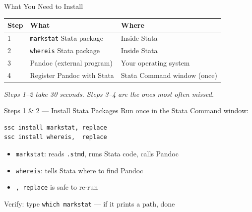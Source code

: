 \documentclass[dvipsnames,hyperref={pdfpagelabels=false}]{beamer}
\begin{document}
\begin{frame}{What You Need to Install}
  \begin{center}
    \begin{tabular}{lll}
      \toprule
      \textbf{Step} & \textbf{What} & \textbf{Where} \\
      \midrule
      1 & \texttt{markstat} Stata package & Inside Stata \\
      2 & \texttt{whereis} Stata package  & Inside Stata \\
      3 & Pandoc (external program)       & Your operating system \\
      4 & Register Pandoc with Stata      & Stata Command window (once) \\
      \bottomrule
    \end{tabular}
  \end{center}

  \vspace{1em}
  \textit{Steps 1--2 take 30 seconds. Steps 3--4 are the ones most often missed.}
\end{frame}

\begin{frame}[fragile]{Steps 1 \& 2 --- Install Stata Packages}
  Run once in the Stata Command window:
  \begin{lstlisting}
ssc install markstat, replace
ssc install whereis,  replace
  \end{lstlisting}

  \begin{itemize}
    \item \texttt{markstat}: reads \texttt{.stmd}, runs Stata code, calls Pandoc
    \item \texttt{whereis}: tells Stata where to find Pandoc
    \item \texttt{, replace} is safe to re-run
  \end{itemize}

  \vspace{0.5em}
  Verify: type \texttt{which markstat} --- if it prints a path, done \checkmark
\end{frame}
\end{document}
